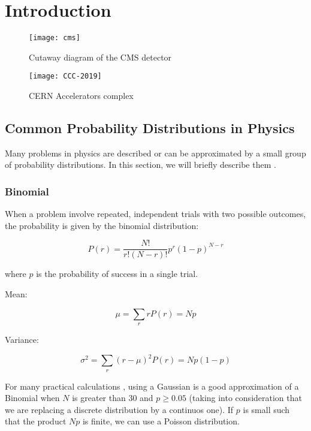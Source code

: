 \chapter{Introduction}

\begin{figure}
	\centerline{
		\texttt{[image: cms]}}
	\caption{Cutaway diagram of the CMS detector \cite{Sakuma_2014}}

\end{figure}

\begin{figure}
	\centerline{
		\texttt{[image: CCC-2019]}}
	\caption{CERN Accelerators complex \cite{Mobs:2684277}}
\end{figure}

\section{Common Probability Distributions in Physics}
\label{distributions1}

Many problems in physics are described or can be approximated by a small group of probability distributions. In this section, we will briefly describe them \cite{leo2012techniques}.

\subsection{Binomial}

When a problem involve repeated, independent trials with two possible outcomes, the probability is given by the binomial distribution:

\begin{equation}
	P(r)= \frac{N! }{ r! \left( N-r \right)! } p^r (1-p)^{N-r}
\end{equation}

where $p$ is the probability of success in a single trial.

Mean:

\begin{equation}
	\mu = \sum_{r}rP(r) = Np
\end{equation}

Variance:

\begin{equation}
	\sigma^2=\sum_r(r-\mu)^2P(r) = Np(1-p)
\end{equation}

For many practical calculations \cite{leo2012techniques}, using a Gaussian is a good approximation of a Binomial when $N$ is greater than 30 and $p\geq0.05$ (taking into consideration that we are replacing a discrete distribution by a continuos one). If $p$ is small such that the product $Np$ is finite, we can use a Poisson distribution.

